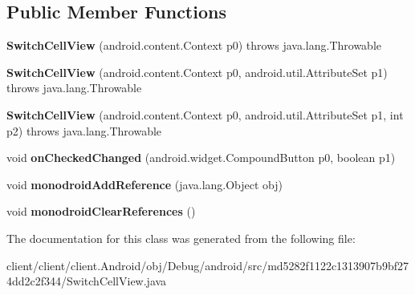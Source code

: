 \subsection*{Public Member Functions}
\begin{DoxyCompactItemize}
\item 
\hypertarget{classmd5282f1122c1313907b9bf274dd2c2f344_1_1SwitchCellView_a4af530ad94f1495031c843dd9ccc2985}{}{\bfseries Switch\+Cell\+View} (android.\+content.\+Context p0)  throws java.\+lang.\+Throwable 	\label{classmd5282f1122c1313907b9bf274dd2c2f344_1_1SwitchCellView_a4af530ad94f1495031c843dd9ccc2985}

\item 
\hypertarget{classmd5282f1122c1313907b9bf274dd2c2f344_1_1SwitchCellView_a6877f0fdbce19136145541f8ad085fe7}{}{\bfseries Switch\+Cell\+View} (android.\+content.\+Context p0, android.\+util.\+Attribute\+Set p1)  throws java.\+lang.\+Throwable 	\label{classmd5282f1122c1313907b9bf274dd2c2f344_1_1SwitchCellView_a6877f0fdbce19136145541f8ad085fe7}

\item 
\hypertarget{classmd5282f1122c1313907b9bf274dd2c2f344_1_1SwitchCellView_a454031b2afcebe9275239caddbd5cce8}{}{\bfseries Switch\+Cell\+View} (android.\+content.\+Context p0, android.\+util.\+Attribute\+Set p1, int p2)  throws java.\+lang.\+Throwable 	\label{classmd5282f1122c1313907b9bf274dd2c2f344_1_1SwitchCellView_a454031b2afcebe9275239caddbd5cce8}

\item 
\hypertarget{classmd5282f1122c1313907b9bf274dd2c2f344_1_1SwitchCellView_a9e5ddc70ebbc8c743d20e799b30f7ed3}{}void {\bfseries on\+Checked\+Changed} (android.\+widget.\+Compound\+Button p0, boolean p1)\label{classmd5282f1122c1313907b9bf274dd2c2f344_1_1SwitchCellView_a9e5ddc70ebbc8c743d20e799b30f7ed3}

\item 
\hypertarget{classmd5282f1122c1313907b9bf274dd2c2f344_1_1SwitchCellView_a934a4492734c2fef6c817380c5bea763}{}void {\bfseries monodroid\+Add\+Reference} (java.\+lang.\+Object obj)\label{classmd5282f1122c1313907b9bf274dd2c2f344_1_1SwitchCellView_a934a4492734c2fef6c817380c5bea763}

\item 
\hypertarget{classmd5282f1122c1313907b9bf274dd2c2f344_1_1SwitchCellView_a2b49eb5ba0a876936b99a891352aee6d}{}void {\bfseries monodroid\+Clear\+References} ()\label{classmd5282f1122c1313907b9bf274dd2c2f344_1_1SwitchCellView_a2b49eb5ba0a876936b99a891352aee6d}

\end{DoxyCompactItemize}


The documentation for this class was generated from the following file\+:\begin{DoxyCompactItemize}
\item 
client/client/client.\+Android/obj/\+Debug/android/src/md5282f1122c1313907b9bf274dd2c2f344/Switch\+Cell\+View.\+java\end{DoxyCompactItemize}
